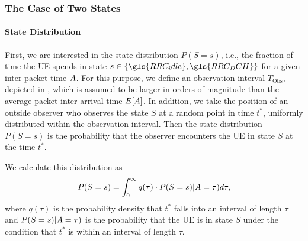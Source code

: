 \subsubsection*{The Case of Two  States}\label{sec:network:performance_model:system_description:two_states}

\newcommand{\RRCState}{S}
\newcommand{\PacketIATDensity}{a}
\newcommand{\RRCStateRealization}{s}
\newcommand{\ObservationInterval}{T_{\text{Obs}}}
\newcommand{\ObservationPoint}{t^*}
\newcommand{\ObservationIntervalDensity}{q}
\newcommand{\ObservationIntervalLength}{\tau}
\newcommand{\NormalisationConstant}{c_0}
\newcommand{\NObservedPackets}{n_{\text{P}}}

\paragraph*{State Distribution}
First, we are interested in the state distribution \(P(\RRCState=\RRCStateRealization)\), i.e., the fraction of time the \gls{UE} spends in state \(\RRCStateRealization\in\{\gls{RRC_idle},\gls{RRC_DCH}\}\) for a given inter-packet time \(A\).
For this purpose, we define an observation interval \(\ObservationInterval\), depicted in , which is assumed to be larger in orders of magnitude than the average packet inter-arrival time \(E[A]\).
In addition, we take the position of an outside observer who observes the state \(\RRCState\) at a random point in time \(\ObservationPoint\), uniformly distributed within the observation interval. 
Then the state distribution \(P(\RRCState=\RRCStateRealization)\) is the probability that the observer encounters the \gls{UE} in state \(\RRCState\) at the time \(\ObservationPoint\). 

We calculate this distribution as 
\begin{equation}
P(\RRCState=\RRCStateRealization)= 
  \int_{0}^\infty \ObservationIntervalDensity(\tau) \cdot 
  P(\RRCState=\RRCStateRealization) \vert \PacketIAT = \ObservationIntervalLength) d\ObservationIntervalLength,
  \label{eq:network:performance_model:system_description:state_distribution} 
\end{equation} 
where \(\ObservationIntervalDensity(\ObservationIntervalLength)\) is the probability density that \(\ObservationPoint\) falls into an interval of length \(\ObservationIntervalLength\) and 
\(P(\RRCState=\RRCStateRealization) \vert \PacketIAT = \ObservationIntervalLength)\)
is the probability that the \gls{UE} is in state \(\RRCState\) under the condition that \(\ObservationPoint\) is within an interval of length \(\ObservationIntervalLength\).

